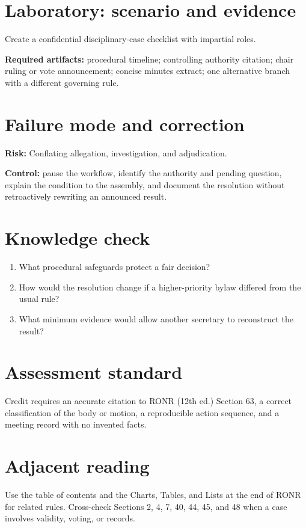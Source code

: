 \documentclass[11pt]{article}
\begin{document}
\section{Laboratory: scenario and evidence}
Create a confidential disciplinary-case checklist with impartial roles.

\textbf{Required artifacts:} procedural timeline; controlling authority citation; chair ruling or vote announcement; concise minutes extract; one alternative branch with a different governing rule.

\section{Failure mode and correction}
\textbf{Risk:} Conflating allegation, investigation, and adjudication.

\textbf{Control:} pause the workflow, identify the authority and pending question, explain the condition to the assembly, and document the resolution without retroactively rewriting an announced result.

\section{Knowledge check}
\begin{enumerate}[leftmargin=*,itemsep=4pt]
\item What procedural safeguards protect a fair decision?
\item How would the resolution change if a higher-priority bylaw differed from the usual rule?
\item What minimum evidence would allow another secretary to reconstruct the result?
\end{enumerate}

\section{Assessment standard}
Credit requires an accurate citation to RONR (12th ed.) Section 63, a correct classification of the body or motion, a reproducible action sequence, and a meeting record with no invented facts.

\section{Adjacent reading}
Use the table of contents and the Charts, Tables, and Lists at the end of RONR for related rules. Cross-check Sections 2, 4, 7, 40, 44, 45, and 48 when a case involves validity, voting, or records.
\end{document}
